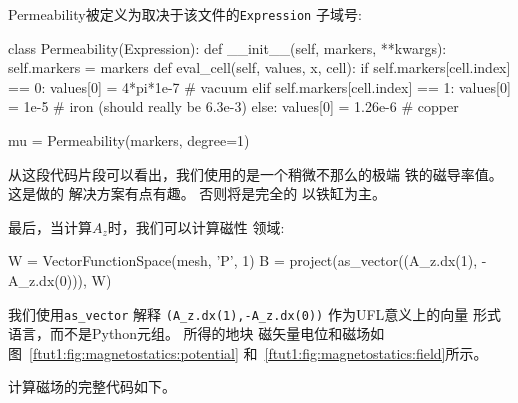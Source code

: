 Permeability被定义为取决于该文件的\texttt{Expression}
子域号:
\begin{python}
class Permeability(Expression):
    def __init__(self, markers, **kwargs):
        self.markers = markers
    def eval_cell(self, values, x, cell):
        if self.markers[cell.index] == 0:
            values[0] = 4*pi*1e-7 # vacuum
        elif self.markers[cell.index] == 1:
            values[0] = 1e-5      # iron (should really be 6.3e-3)
        else:
            values[0] = 1.26e-6   # copper

mu = Permeability(markers, degree=1)
\end{python}
从这段代码片段可以看出，我们使用的是一个稍微不那么的极端
铁的磁导率值。 这是做的
解决方案有点有趣。 否则将是完全的
以铁缸为主。

最后，当计算$A_z$时，我们可以计算磁性
领域:

\begin{python}
W = VectorFunctionSpace(mesh, 'P', 1)
B = project(as_vector((A_z.dx(1), -A_z.dx(0))), W)
\end{python}
我们使用\verb!as_vector! 解释
\verb!(A_z.dx(1),-A_z.dx(0))! 作为UFL意义上的向量
形式语言，而不是Python元组。 所得的地块
磁矢量电位和磁场如图~\ref{ftut1:fig:magnetostatics:potential}
和~\ref{ftut1:fig:magnetostatics:field}所示。



计算磁场的完整代码如下。

